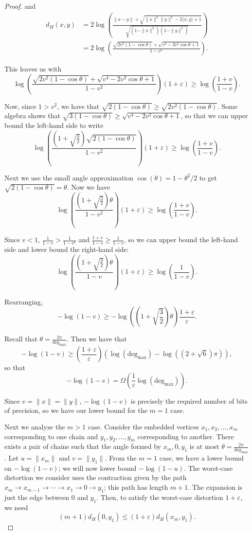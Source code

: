 \begin{proof}
and
\begin{align*}
d_H(x,y) &= 2 \log \left( \frac{\|x-y\| + \sqrt{\|x\|^2\|y\|^2 -2\langle x,y \rangle + 1}}{\sqrt{(1-\|x\|^2)(1-\|y\|^2)}} \right) \\
&=2 \log \left(\frac{\sqrt{2v^2(1-\cos \theta)} + \sqrt{v^4-2v^2 \cos \theta + 1}}{1-v^2} \right).
\end{align*}

This leaves us with 
\[  \log \left(\frac{\sqrt{2v^2(1-\cos \theta)} + \sqrt{v^4-2v^2 \cos \theta + 1}}{1-v^2} \right) (1+\varepsilon) \geq \log \left(\frac{1+v}{1-v} \right).\]

Now, since $1 > v^2$, we have that $\sqrt{2(1-\cos \theta)} \geq\sqrt{2v^2(1-\cos \theta)}$. Some algebra shows that  $\sqrt{3(1-\cos \theta)} \geq\sqrt{v^4 - 2v^2\cos \theta + 1}$, so that we can upper bound the left-hand side to write 
\[  \log \left(\frac{(1+\sqrt{\frac{3}{2}}) \sqrt{2(1-\cos \theta)}}{1-v^2} \right) (1+\varepsilon) \geq \log \left(\frac{1+v}{1-v} \right) .\]

Next we use the small angle approximation $\cos(\theta) = 1-\theta^2/2$ to get $\sqrt{2(1-\cos \theta)} = \theta$. Now we have
\[  \log \left(\frac{(1+\sqrt{\frac{3}{2}})  \theta }{1-v^2} \right) (1+\varepsilon) \geq \log \left(\frac{1+v}{1-v} \right) .\]

Since $v < 1$, $\frac{1}{1-v} > \frac{1}{1-v^2}$ and $\frac{1+v}{1-v} \geq \frac{1}{1-v}$, so we can upper bound the left-hand side and lower bound the right-hand side:
\[  \log \left(\frac{(1+\sqrt{\frac{3}{2}})  \theta }{1-v} \right) (1+\varepsilon) \geq  \log \left(\frac{1}{1-v} \right).\]

Rearranging,
\[ -\log(1-v) \geq -\log\left( \left(1+\sqrt{\frac{3}{2}}\right) \theta\right) \frac{1+\varepsilon}{\varepsilon}.\]

Recall that $\theta = \frac{2\pi}{\text{deg}_{\max}}$. Then we have that
\[-\log(1-v) \geq \left(\frac{1+\varepsilon}{\varepsilon} \right) \left(\log (\text{deg}_{\max}) - \log((2+\sqrt{6})\pi) \right),\]
so that
\[-\log(1-v) = \Omega\left(\frac{1}{\varepsilon} \log (\text{deg}_{\max}) \right).\]

Since $v = \|x\| = \|y\|$, $-\log(1-v)$ is precisely the required number of bits of precision, so we have our lower bound for the $m=1$ case. 

Next we analyze the $m>1$ case. Consider the embedded vertices $x_1, x_2, \ldots, x_m$ corresponding to one chain and $y_1, y_2, \ldots, y_m$ corresponding to another. There exists a pair of chains such that the angle formed by $x_m, 0, y_1$ is at most $\theta = \frac{2\pi}{\text{deg}_{\max}}$. Let $u = \|x_m\|$ and $v = \|y_1\|$. From the $m=1$ case, we have a lower bound on $-\log(1-v)$; we will now lower bound $-\log(1-u)$. The worst-case distortion we consider uses the contraction given by the path $x_m \rightarrow x_{m-1} \rightarrow \cdots \rightarrow x_1 \rightarrow 0 \rightarrow y_1$; this path has length $m+1$. The expansion is just the edge between $0$ and $y_1$. Then, to satisfy the worst-case distortion $1+\varepsilon$, we need
\[(m+1)d_H(0,y_1) \leq (1+\varepsilon)d_H(x_m,y_1).\]


\end{proof}
